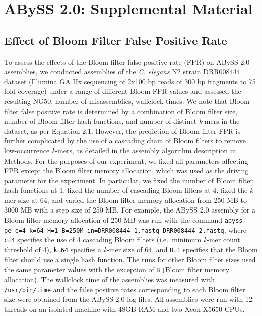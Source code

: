\documentclass[
  12pt,
  oneside,
  openany]{book}
\begin{document}
\begin{appendices}

\renewcommand\chaptername{Appendix}

\hypertarget{abyss-2.0-supplemental-material}{%
\chapter{ABySS 2.0: Supplemental Material}\label{abyss-2.0-supplemental-material}}

\hypertarget{effect-of-bloom-filter-false-positive-rate-1}{%
\section{Effect of Bloom Filter False Positive Rate}\label{effect-of-bloom-filter-false-positive-rate-1}}

To assess the effects of the Bloom filter false positive rate (FPR) on ABySS 2.0 assemblies, we conducted assemblies of the \emph{C. elegans} N2 strain DRR008444 dataset (Illumina GA IIx sequencing of 2x100 bp reads of 300 bp fragments to 75 fold coverage) under a range of different Bloom FPR values and assessed the resulting NG50, number of misassemblies, wallclock times. We note that Bloom filter false positive rate is determined by a combination of Bloom filter size, number of Bloom filter hash functions, and number of distinct \emph{k}-mers in the dataset, as per Equation 2.1. However, the prediction of Bloom filter FPR is further complicated by the use of a cascading chain of Bloom filters to remove low-occurrence \emph{k}-mers, as detailed in the assembly algorithm description in Methods. For the purposes of our experiment, we fixed all parameters affecting FPR except the Bloom filter memory allocation, which was used as the driving parameter for the experiment. In particular, we fixed the number of Bloom filter hash functions at 1, fixed the number of cascading Bloom filters at 4, fixed the \emph{k}-mer size at 64, and varied the Bloom filter memory allocation from 250 MB to 3000 MB with a step size of 250 MB. For example, the ABySS 2.0 assembly for a Bloom filter memory allocation of 250 MB was run with the command \texttt{abyss-pe\ c=4\ k=64\ H=1\ B=250M\ in=\textquotesingle{}DRR008444\_1.fastq\ DRR008444\_2.fastq\textquotesingle{}}, where \texttt{c=4} specifies the use of 4 cascading Bloom filters (i.e.~minimum \emph{k}-mer count threshold of 4), \texttt{k=64} specifies a \emph{k}-mer size of 64, and \texttt{H=1} specifies that the Bloom filter should use a single hash function. The runs for other Bloom filter sizes used the same parameter values with the exception of \texttt{B} (Bloom filter memory allocation). The wallclock time of the assemblies was measured with \texttt{/usr/bin/time} and the false positive rates corresponding to each Bloom filter size were obtained from the ABySS 2.0 log files. All assemblies were run with 12 threads on an isolated machine with 48GB RAM and two Xeon X5650 CPUs.


\end{appendices}
\end{document}

